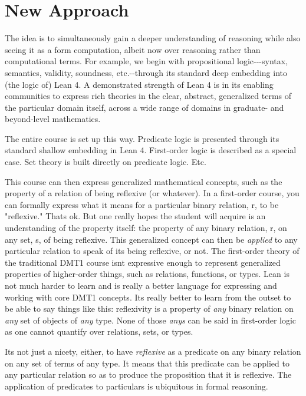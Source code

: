 \documentclass{book}
\begin{document}
\hypertarget{pandoc.profile.debug__pandoc__debug__src__preface.md__new-approach}{%
\section*{New Approach}\label{pandoc.profile.debug__pandoc__debug__src__preface.md__new-approach}}

The idea is to simultaneously gain a deeper understanding of reasoning while also
seeing it as a form computation, albeit now over reasoning rather than computational
terms. For example, we begin with propositional logic-\/-\/-syntax, semantics, validity,
soundness, etc.-\/-through its standard deep embedding into (the logic of) Lean 4. A
demonstrated strength of Lean 4 is in its enabling communities to express rich theories
in the clear, abstract, generalized terms of the particular domain itself, across a wide
range of domains in graduate- and beyond-level mathematics.

The entire course is set up this way. Predicate logic is presented through its standard
shallow embedding in Lean 4. First-order logic is described as a special case. Set theory
is built directly on predicate logic. Etc.

This course can then express generalized mathematical concepts, such as the property of
a relation of being reflexive (or whatever). In a first-order course, you can formally
express what it means for a particular binary relation, r, to be "reflexive." That\textquotesingle s ok.
But one really hopes the student will acquire is an understanding of the property itself:
the property of any binary relation, r, on any set, s, of being reflexive. This generalized
concept can then be \emph{applied} to any particular relation to speak of its being reflexive,
or not. The first-order theory of the traditional DMT1 course isn\textquotesingle t expressive enough to
represent generalized properties of higher-order things, such as relations, functions, or
types. Lean is not much harder to learn and is really a better language for expressing
and working with core DMT1 concepts. It\textquotesingle s really better to learn from the outset to be
able to say things like this: reflexivity is a property of \emph{any} binary relation on \emph{any}
set of objects of \emph{any} type. None of those \emph{anys} can be said in first-order logic as one
cannot quantify over relations, sets, or types.

It\textquotesingle s not just a nicety, either, to have \emph{reflexive} as a predicate on any binary
relation on any set of terms of any type. It means that this predicate can be applied
to any particular relation so as to produce the proposition that it is reflexive. The
application of predicates to particulars is ubiquitous in formal reasoning.
\end{document}
